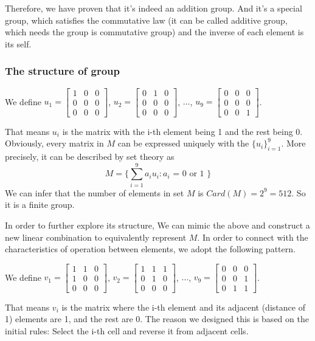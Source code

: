 \documentclass[
  manuscript=article,  %
  layout=preprint,  %
  year=20xx,
  volume=x,
]{extra/joas}
\begin{document}
\par Therefore, we have proven that it's indeed an addition group. And it's a special group, which satisfies the commutative law
(it can be called additive group, which needs the group is commutative group) and the inverse of each element is its self.


\subsubsection{The structure of group}
We define $u_1 = \begin{bmatrix} 1 & 0 & 0  \\ 0 & 0 & 0  \\ 0 & 0 & 0\end{bmatrix}$, 
$u_2 = \begin{bmatrix} 0 & 1 & 0  \\ 0 & 0 & 0  \\ 0 & 0 & 0\end{bmatrix}$, $\dots$, 
$u_9 = \begin{bmatrix} 0 & 0 & 0  \\ 0 & 0 & 0  \\ 0 & 0 & 1\end{bmatrix}$.
\par That means $u_i$ is the matrix with the i-th element being 1 and the rest being 0.
Obviously, every matrix in $M$ can be expressed uniquely with the $\{ u_i\}_{i=1}^9$.
More precisely, it can be described by set theory as 
$$M = \{ \sum_{i=1}^{9} a_i u_i:\text{$a_i$ = 0 or 1 } \}$$
We can infer that the number of elements in set $M$ is $Card(M) = 2^9 = 512$.
So it is a finite group.
\par In order to further explore its structure, 
We can mimic the above and construct a new linear combination to equivalently represent $M$.
In order to connect with the characteristics of operation between elements, we adopt the following pattern.
\par We define $v_1 = \begin{bmatrix} 1 & 1 & 0  \\ 1 & 0 & 0  \\ 0 & 0 & 0\end{bmatrix}$, 
$v_2 = \begin{bmatrix} 1 & 1 & 1  \\ 0 & 1 & 0  \\ 0 & 0 & 0\end{bmatrix}$, $\dots$, 
$v_9 = \begin{bmatrix} 0 & 0 & 0  \\ 0 & 0 & 1  \\ 0 & 1 & 1\end{bmatrix}$.
\par That means $v_i$ is the matrix where 
the i-th element and its adjacent (distance of 1) elements are 1, and the rest are 0.
The reason we designed this is based on the initial rules: Select the i-th cell and reverse it from adjacent cells.
\end{document}
